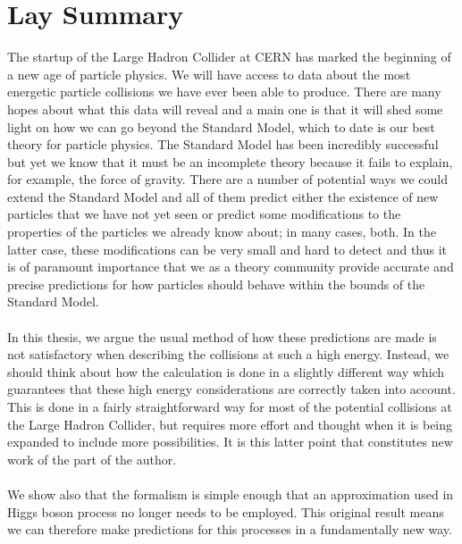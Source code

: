 \chapter*{Lay Summary}

\noindent

\normalsize

The startup of the Large Hadron Collider at CERN has marked the beginning of a new age of particle physics. We will have access to data about the most energetic particle collisions we have ever been able to produce. There are many hopes about what this data will reveal and a main one is that it will shed some light on how we can go beyond the Standard Model, which to date is our best theory for particle physics. The Standard Model has been incredibly successful but yet we know that it must be an incomplete theory because it fails to explain, for example, the force of gravity. There are a number of potential ways we could extend the Standard Model and all of them predict either the existence of new particles that we have not yet seen or predict some modifications to the properties of the particles we already know about; in many cases, both. In the latter case, these modifications can be very small and hard to detect and thus it is of paramount importance that we as a theory community provide accurate and precise predictions for how particles should behave within the bounds of the Standard Model. \\
\\
In this thesis, we argue the usual method of how these predictions are made is not satisfactory when describing the collisions at such a high energy. Instead, we should think about how the calculation is done in a slightly different way which guarantees that these high energy considerations are correctly taken into account. This is done in a fairly straightforward way for most of the potential collisions at the Large Hadron Collider, but requires more effort and thought when it is being expanded to include more possibilities. It is this latter point that constitutes new work of the part of the author. \\
\\
We show also that the formalism is simple enough that an approximation used in Higgs boson process no longer needs to be employed. This original result means we can therefore make predictions for this processes in a fundamentally new way. 

